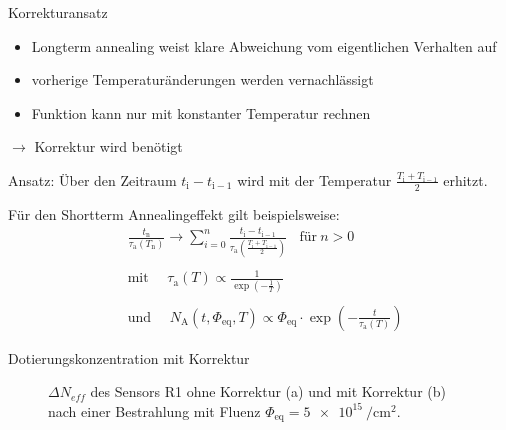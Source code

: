 \documentclass[aspectratio=1610, 9pt]{beamer}
\begin{document}
\begin{frame}{Korrekturansatz}
  \begin{itemize}
    \item Longterm annealing weist klare Abweichung vom eigentlichen Verhalten auf
    \medskip
    \item vorherige Temperaturänderungen werden vernachlässigt
    \medskip
    \item Funktion kann nur mit konstanter Temperatur rechnen
  \end{itemize}
  \medskip
  $\rightarrow$ Korrektur wird benötigt
  \medskip

  Ansatz: Über den Zeitraum $t_{\mathrm{i}} - t_{\mathrm{i-1}}$ wird mit der Temperatur $\frac{T_{\mathrm{i}} +T_{\mathrm{i-1}}}{2}$ erhitzt.

  Für den Shortterm Annealingeffekt gilt beispielsweise:
  \begin{align*}
    &\frac{t_{\mathrm{n}}}{\tau_{\mathrm{a}}(T_{\mathrm{n}})} \rightarrow \sum_{i=0}^n  \frac{t_{\mathrm{i}} - t_{\mathrm{i-1}}}{\tau_{\mathrm{a}}(\frac{T_{\mathrm{i}} +T_{\mathrm{i-1}}}{2})} \:\:\:\: \text{für} \: n>0 \\
    \\
    &\text{mit} \:\:\:\:\:\: \tau_{\mathrm{a}}(T) \propto \frac{1}{\exp{\left(-\frac{1}{T}\right)}} \\
    \\
    &\text{und}  \:\:\:\:\:\: N_{\mathrm{A}}(t, \Phi_{\mathrm{eq}}, T)     \propto \Phi_{\mathrm{eq}} \cdot \exp{\left(-\frac{t}{\tau_{\mathrm{a}}(T)}\right) }
  \end{align*}
\end{frame}

\begin{frame}{Dotierungskonzentration mit Korrektur}
  \begin{figure}
  \caption{$\Delta N_{eff}$ des Sensors R1 ohne Korrektur (a) und mit Korrektur (b) nach einer Bestrahlung mit Fluenz $\Phi_{\mathrm{eq}} = \SI{5e15}{\per\centi\meter\squared}.$}
  \end{figure}
\end{frame}
\end{document}
